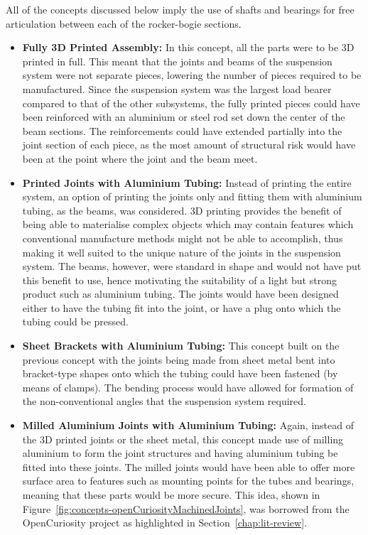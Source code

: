       All of the concepts discussed below imply the use of shafts and bearings for free articulation between each of the rocker-bogie sections.
      
      \begin{itemize}
        \item \textbf{Fully 3D Printed Assembly:} In this concept, all the parts were to be 3D printed in full. This meant that the joints and beams of the suspension system were not separate pieces, lowering the number of pieces required to be manufactured. Since the suspension system was the largest load bearer compared to that of the other subsystems, the fully printed pieces could have been reinforced with an aluminium or steel rod set down the center of the beam sections. The reinforcements could have extended partially into the joint section of each piece, as the most amount of structural risk would have been at the point where the joint and the beam meet.
        
        \item \textbf{Printed Joints with Aluminium Tubing:} Instead of printing the entire system, an option of printing the joints only and fitting them with aluminium tubing, as the beams, was considered. 3D printing provides the benefit of being able to materialise complex objects which may contain features which conventional manufacture methods might not be able to accomplish, thus making it well suited to the unique nature of the joints in the suspension system. The beams, however, were standard in shape and would not have put this benefit to use, hence motivating the suitability of a light but strong product such as aluminium tubing. The joints would have been designed either to have the tubing fit into the joint, or have a plug onto which the tubing could be pressed.
      
        \item \textbf{Sheet Brackets with Aluminium Tubing:} This concept built on the previous concept with the joints being made from sheet metal bent into bracket-type shapes onto which the tubing could have been fastened (by means of clamps). The bending process would have allowed for formation of the non-conventional angles that the suspension system required.
        
        \item \textbf{Milled Aluminium Joints with Aluminium Tubing:} Again, instead of the 3D printed joints or the sheet metal, this concept made use of milling aluminium to form the joint structures and having aluminium tubing be fitted into these joints. The milled joints would have been able to offer more surface area to features such as mounting points for the tubes and bearings, meaning that these parts would be more secure. This idea, shown in Figure~\ref{fig:concepts-openCuriosityMachinedJoints}, was borrowed from the OpenCuriosity project \cite{opencuriosity2014} as highlighted in Section~\ref{chap:lit-review}.
        

\end{itemize}
